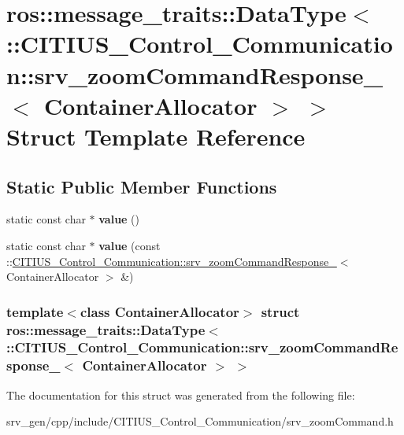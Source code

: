 \hypertarget{structros_1_1message__traits_1_1_data_type_3_01_1_1_c_i_t_i_u_s___control___communication_1_1srve571f5768f87137c64cbce30d036032c}{\section{ros\-:\-:message\-\_\-traits\-:\-:\-Data\-Type$<$ \-:\-:\-C\-I\-T\-I\-U\-S\-\_\-\-Control\-\_\-\-Communication\-:\-:srv\-\_\-zoom\-Command\-Response\-\_\-$<$ \-Container\-Allocator $>$ $>$ \-Struct \-Template \-Reference}
\label{structros_1_1message__traits_1_1_data_type_3_01_1_1_c_i_t_i_u_s___control___communication_1_1srve571f5768f87137c64cbce30d036032c}
}
\subsection*{\-Static \-Public \-Member \-Functions}
\begin{DoxyCompactItemize}
\item 
\hypertarget{structros_1_1message__traits_1_1_data_type_3_01_1_1_c_i_t_i_u_s___control___communication_1_1srve571f5768f87137c64cbce30d036032c_a5709c258786155396e720398e64c469e}{static const char $\ast$ {\bfseries value} ()}\label{structros_1_1message__traits_1_1_data_type_3_01_1_1_c_i_t_i_u_s___control___communication_1_1srve571f5768f87137c64cbce30d036032c_a5709c258786155396e720398e64c469e}

\item 
\hypertarget{structros_1_1message__traits_1_1_data_type_3_01_1_1_c_i_t_i_u_s___control___communication_1_1srve571f5768f87137c64cbce30d036032c_a42df9bc522652f0e8f7e6d88da070009}{static const char $\ast$ {\bfseries value} (const \-::\hyperlink{struct_c_i_t_i_u_s___control___communication_1_1srv__zoom_command_response__}{\-C\-I\-T\-I\-U\-S\-\_\-\-Control\-\_\-\-Communication\-::srv\-\_\-zoom\-Command\-Response\-\_\-}$<$ \-Container\-Allocator $>$ \&)}\label{structros_1_1message__traits_1_1_data_type_3_01_1_1_c_i_t_i_u_s___control___communication_1_1srve571f5768f87137c64cbce30d036032c_a42df9bc522652f0e8f7e6d88da070009}

\end{DoxyCompactItemize}
\subsubsection*{template$<$class Container\-Allocator$>$ struct ros\-::message\-\_\-traits\-::\-Data\-Type$<$ \-::\-C\-I\-T\-I\-U\-S\-\_\-\-Control\-\_\-\-Communication\-::srv\-\_\-zoom\-Command\-Response\-\_\-$<$ Container\-Allocator $>$ $>$}



\-The documentation for this struct was generated from the following file\-:\begin{DoxyCompactItemize}
\item 
srv\-\_\-gen/cpp/include/\-C\-I\-T\-I\-U\-S\-\_\-\-Control\-\_\-\-Communication/srv\-\_\-zoom\-Command.\-h\end{DoxyCompactItemize}
